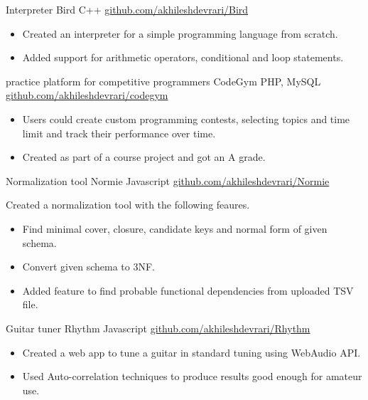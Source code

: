 \documentclass[]{awesome-cv}
\begin{document}
\vspace{-7mm}
\begin{cventries}
	\cventry
	{Interpreter}
	{Bird}
	{C++}
	{\href{https://github.com/akhileshdevrari/Bird}{github.com/akhileshdevrari/Bird}}
	{
		\vspace{-3mm}
		\begin{itemize}
			\item Created an interpreter for a simple programming language from scratch.
			\item Added support for arithmetic operators, conditional and loop statements.
		\end{itemize}		
	}
	
	\vspace{-2mm}
	\cventry
	{practice platform for competitive programmers}
	{CodeGym}
	{PHP, MySQL}
	{\href{https://github.com/akhileshdevrari/codegym}{github.com/akhileshdevrari/codegym}}
	{
		\vspace{-3mm}
		\begin{itemize}
			\item Users could create custom programming contests, selecting topics and time limit and track their performance over time.
			\item Created as part of a course project and got an A grade.
		\end{itemize}
	}
	
	
	\vspace{-2mm}
	\cventry
	{Normalization tool}
	{Normie}
	{Javascript}
	{\href{https://github.com/akhileshdevrari/Normie}{github.com/akhileshdevrari/Normie}}
	{
		Created a normalization tool with the following feaures.
		\begin{itemize}
			\item Find minimal cover, closure, candidate keys and normal form of given schema.
			\item Convert given schema to 3NF.
			\item Added feature to find probable functional dependencies from uploaded TSV file.
		\end{itemize}
	}
	
	\vspace{-2mm}
	\cventry
	{Guitar tuner}
	{Rhythm}
	{Javascript}
	{\href{https://github.com/akhileshdevrari/Rhythm}{github.com/akhileshdevrari/Rhythm}}
	{
		\vspace{-3mm}
		\begin{itemize}
		\item Created a web app to tune a guitar in standard tuning using WebAudio API.
		\item Used Auto-correlation techniques to produce results good enough for amateur use.
		\end{itemize}	
	}
	
\end{cventries}
\end{document}
